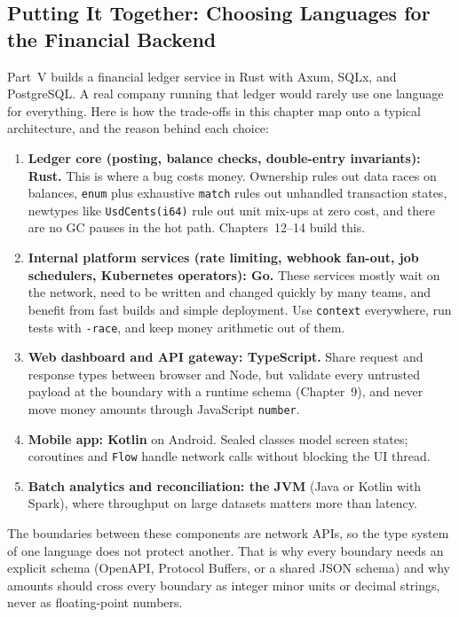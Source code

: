 \subsection{Putting It Together: Choosing Languages for the Financial Backend}

Part~V builds a financial ledger service in Rust with Axum, SQLx, and PostgreSQL. A real company running that ledger would rarely use one language for everything. Here is how the trade-offs in this chapter map onto a typical architecture, and the reason behind each choice:

\begin{enumerate}
  \item \textbf{Ledger core (posting, balance checks, double-entry invariants): Rust.} This is where a bug costs money. Ownership rules out data races on balances, \texttt{enum} plus exhaustive \texttt{match} rules out unhandled transaction states, newtypes like \texttt{UsdCents(i64)} rule out unit mix-ups at zero cost, and there are no GC pauses in the hot path. Chapters~12--14 build this.
  \item \textbf{Internal platform services (rate limiting, webhook fan-out, job schedulers, Kubernetes operators): Go.} These services mostly wait on the network, need to be written and changed quickly by many teams, and benefit from fast builds and simple deployment. Use \texttt{context} everywhere, run tests with \texttt{-race}, and keep money arithmetic out of them.
  \item \textbf{Web dashboard and API gateway: TypeScript.} Share request and response types between browser and Node, but validate every untrusted payload at the boundary with a runtime schema (Chapter~9), and never move money amounts through JavaScript \texttt{number}.
  \item \textbf{Mobile app: Kotlin} on Android. Sealed classes model screen states; coroutines and \texttt{Flow} handle network calls without blocking the UI thread.
  \item \textbf{Batch analytics and reconciliation: the JVM} (Java or Kotlin with Spark), where throughput on large datasets matters more than latency.
\end{enumerate}

The boundaries between these components are network APIs, so the type system of one language does not protect another. That is why every boundary needs an explicit schema (OpenAPI, Protocol Buffers, or a shared JSON schema) and why amounts should cross every boundary as integer minor units or decimal strings, never as floating-point numbers.


